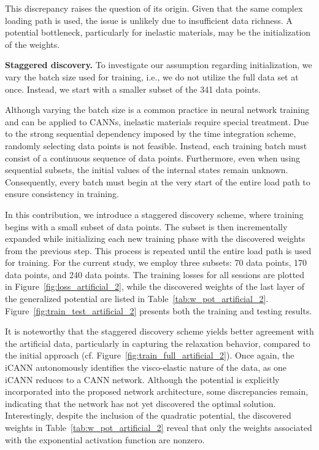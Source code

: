 This discrepancy raises the question of its origin. 
Given that the same complex loading path is used, the issue is unlikely due to insufficient data richness. 
A potential bottleneck, particularly for inelastic materials, may be the initialization of the weights.\newline 

\textbf{Staggered discovery.} To investigate our assumption regarding initialization, we vary the batch size used for training, i.e., we do not utilize the full data set at once. 
Instead, we start with a smaller subset of the 341 data points. 

Although varying the batch size is a common practice in neural network training and can be applied to CANNs, inelastic materials require special treatment. 
Due to the strong sequential dependency imposed by the time integration scheme, randomly selecting data points is not feasible. 
Instead, each training batch must consist of a continuous sequence of data points.
Furthermore, even when using sequential subsets, the initial values of the internal states remain unknown. 
Consequently, every batch must begin at the very start of the entire load path to ensure consistency in training.

In this contribution, we introduce a staggered discovery scheme, where training begins with a small subset of data points. 
The subset is then incrementally expanded while initializing each new training phase with the discovered weights from the previous step. 
This process is repeated until the entire load path is used for training.
For the current study, we employ three subsets: 70 data points, 170 data points, and 240 data points. 
The training losses for all sessions are plotted in Figure~\ref{fig:loss_artificial_2}, while the discovered weights of the last layer of the generalized potential are listed in Table~\ref{tab:w_pot_artificial_2}. 
Figure~\ref{fig:train_test_artificial_2} presents both the training and testing results.

It is noteworthy that the staggered discovery scheme yields better agreement with the artificial data, particularly in capturing the relaxation behavior, compared to the initial approach (cf. Figure~\ref{fig:train_full_artificial_2}). 
Once again, the iCANN autonomously identifies the visco-elastic nature of the data, as one iCANN reduces to a CANN network.
Although the potential is explicitly incorporated into the proposed network architecture, some discrepancies remain, indicating that the network has not yet discovered the optimal solution. 
Interestingly, despite the inclusion of the quadratic potential, the discovered weights in Table~\ref{tab:w_pot_artificial_2} reveal that only the weights associated with the exponential activation function are nonzero.

